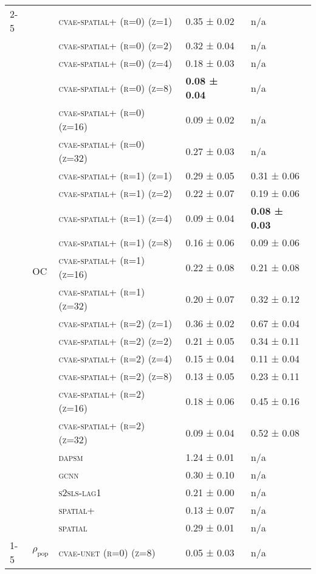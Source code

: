 \documentclass{article}
\begin{document}
\begin{table}[!tbp]
\begin{tabular}{lllll}
\cline{2-5}
 & \multirow[t]{23}{*}{OC} & \textsc{cvae-spatial+ (r=0) (z=1)} & 0.35 ± { 0.02} & n/a \\
 &  & \textsc{cvae-spatial+ (r=0) (z=2)} & 0.32 ± { 0.04} & n/a \\
 &  & \textsc{cvae-spatial+ (r=0) (z=4)} & 0.18 ± { 0.03} & n/a \\
 &  & \textsc{cvae-spatial+ (r=0) (z=8)} & \bf 0.08 ± { 0.04} & n/a \\
 &  & \textsc{cvae-spatial+ (r=0) (z=16)} & 0.09 ± { 0.02} & n/a \\
 &  & \textsc{cvae-spatial+ (r=0) (z=32)} & 0.27 ± { 0.03} & n/a \\
 &  & \textsc{cvae-spatial+ (r=1) (z=1)} & 0.29 ± { 0.05} & 0.31 ± { 0.06} \\
 &  & \textsc{cvae-spatial+ (r=1) (z=2)} & 0.22 ± { 0.07} & 0.19 ± { 0.06} \\
 &  & \textsc{cvae-spatial+ (r=1) (z=4)} & 0.09 ± { 0.04} & \bf 0.08 ± { 0.03} \\
 &  & \textsc{cvae-spatial+ (r=1) (z=8)} & 0.16 ± { 0.06} & 0.09 ± { 0.06} \\
 &  & \textsc{cvae-spatial+ (r=1) (z=16)} & 0.22 ± { 0.08} & 0.21 ± { 0.08} \\
 &  & \textsc{cvae-spatial+ (r=1) (z=32)} & 0.20 ± { 0.07} & 0.32 ± { 0.12} \\
 &  & \textsc{cvae-spatial+ (r=2) (z=1)} & 0.36 ± { 0.02} & 0.67 ± { 0.04} \\
 &  & \textsc{cvae-spatial+ (r=2) (z=2)} & 0.21 ± { 0.05} & 0.34 ± { 0.11} \\
 &  & \textsc{cvae-spatial+ (r=2) (z=4)} & 0.15 ± { 0.04} & 0.11 ± { 0.04} \\
 &  & \textsc{cvae-spatial+ (r=2) (z=8)} & 0.13 ± { 0.05} & 0.23 ± { 0.11} \\
 &  & \textsc{cvae-spatial+ (r=2) (z=16)} & 0.18 ± { 0.06} & 0.45 ± { 0.16} \\
 &  & \textsc{cvae-spatial+ (r=2) (z=32)} & 0.09 ± { 0.04} & 0.52 ± { 0.08} \\
 &  & \textsc{dapsm} & 1.24 ± { 0.01} & n/a \\
 &  & \textsc{gcnn} & 0.30 ± { 0.10} & n/a \\
 &  & \textsc{s2sls-lag1} & 0.21 ± { 0.00} & n/a \\
 &  & \textsc{spatial+} & 0.13 ± { 0.07} & n/a \\
 &  & \textsc{spatial} & 0.29 ± { 0.01} & n/a \\
\cline{1-5} \cline{2-5}
\multirow[t]{38}{*}{$ (SC)\; PM\_{2.5} \;\to\; m \;(r=1) $} & \multirow[t]{19}{*}{$\rho_{\text{pop}}$} & \textsc{cvae-unet (r=0) (z=8)} & 0.05 ± { 0.03} & n/a \\

\end{tabular}
\end{table}
\end{document}
